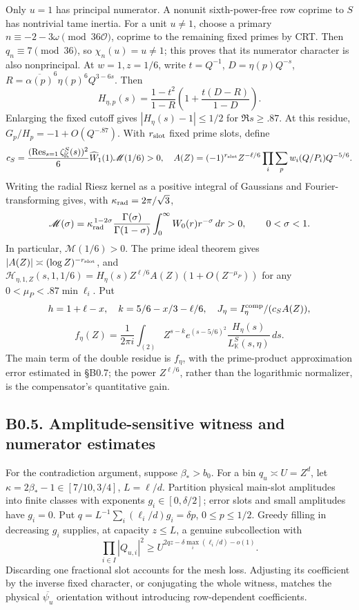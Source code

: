 \documentclass[11pt,a4paper]{article}
\begin{document}
Only \(u=1\) has principal numerator. A nonunit sixth-power-free row
coprime to \(S\) has nontrivial tame inertia. For a unit \(u\ne1\),
choose a primary \(n\equiv-2-3\omega\pmod{36\mathcal O}\), coprime to
the remaining fixed primes by CRT. Then \(q_n\equiv7\pmod{36}\), so
\(\chi_n(u)=u\ne1\); this proves that its numerator character is also
nonprincipal. At \(w=1,\allowbreak{}z=1/6\), write \(t=Q^{-1}\), \(D=\eta(p)Q^{-s}\),
\(R=\overline{\alpha(p)}^6\eta(p)^6Q^{3-6s}\). Then \[
H_{\eta,p}(s)=\frac{1-t^2}{1-R}\left(1+\frac{t(D-R)}{1-D}\right).
\tag{B0.35}
\] Enlarging the fixed cutoff gives \(|H_\eta(s)-1|\le1/2\) for
\(\Re s\ge.87\). At this residue, \(G_p/H_p=-1+O(Q^{-.87})\). With
\(r_{\rm slot}\) fixed prime slots, define \[
c_S=\frac{(\operatorname{Res}_{s=1}\zeta_{\mathbb K}^S(s))^2}{6}\widehat W_1(1)\mathscr M(1/6)>0,
\quad A(Z)=(-1)^{r_{\rm slot}}Z^{-\ell/6}\prod_i\sum_pw_i(Q/P_i)Q^{-5/6}.
\] Writing the radial Riesz kernel as a positive integral of Gaussians
and Fourier-transforming gives, with \(\kappa_{\rm rad}=2\pi/\sqrt3\),
\[
\mathscr M(\sigma)=\kappa_{\rm rad}^{\,1-2\sigma}
\frac{\Gamma(\sigma)}{\Gamma(1-\sigma)}
\int_0^\infty W_0(r)r^{-\sigma}\,dr>0,\qquad 0<\sigma<1.
\] In particular, \(\mathscr M(1/6)>0\). The prime ideal theorem gives
\(|A(Z)|\asymp(\log Z)^{-r_{\rm slot}}\), and
\(\mathcal H_{\eta,\allowbreak{}1,\allowbreak{}Z}(s,\allowbreak{}1,\allowbreak{}1/6)=H_\eta(s)Z^{\ell/6}A(Z)(1+O(Z^{-\mu_P}))\)
for any \(0<\mu_P<.87\min\ell_i\). Put \[
h=1+\ell-x,\quad k=5/6-x/3-\ell/6,\quad J_\eta=I_\eta^{\rm comp}/(c_SA(Z)),
\] \[
f_\eta(Z)=\frac1{2\pi i}\int_{(2)}Z^{s-k}e^{(s-5/6)^2}\frac{H_\eta(s)}{L_{\mathbb K}^S(s,\eta)}\,ds.
\tag{B0.36}
\] The main term of the double residue is \(f_\eta\), with the
prime-product approximation error estimated in §B0.7; the power
\(Z^{\ell/6}\), rather than the logarithmic normalizer, is the
compensator's quantitative gain.

\hypertarget{b0.5.-amplitude-sensitive-witness-and-numerator-estimates}{%
\subsection{B0.5. Amplitude-sensitive witness and numerator
estimates}\label{b0.5.-amplitude-sensitive-witness-and-numerator-estimates}}

For the contradiction argument, suppose \(\beta_*>b_0\). For a bin
\(q_u\asymp U=Z^d\), let \(\kappa=2\beta_*-1\in[7/10,\allowbreak{}3/4]\),
\(L=\ell/d\). Partition physical main-slot amplitudes into finite
classes with exponents \(g_i\in[0,\allowbreak{}\delta/2]\); error slots and small
amplitudes have \(g_i=0\). Put \(q=L^{-1}\sum_i(\ell_i/d)g_i=\delta p\),
\(0\le p\le1/2\). Greedy filling in decreasing \(g_i\) supplies, at
capacity \(z\le L\), a genuine subcollection with \[
\prod_{i\in I}|Q_{u,i}|^2\ge U^{2qz-\delta\max_i(\ell_i/d)-o(1)}.
\tag{B0.37}
\] Discarding one fractional slot accounts for the mesh loss. Adjusting
its coefficient by the inverse fixed character, or conjugating the whole
witness, matches the physical \(\overline{\psi_u}\) orientation without
introducing row-dependent coefficients.
\end{document}
